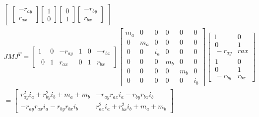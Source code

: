 \documentclass{article}
\begin{document}
\begin{gather}
\begin{bmatrix}
	\begin{bmatrix} -r_{ay} \\ r_{ax} \end{bmatrix}
	\begin{bmatrix} 1 \\ 0  \end{bmatrix}
	\begin{bmatrix} 0 \\ 1 \end{bmatrix}
	\begin{bmatrix} -r_{by} \\ r_{bx} \end{bmatrix}
\end{bmatrix} \\ 
JMJ^T = \begin{bmatrix}1&0&-r_{ay}&1&0&-r_{bx}\\ \:\:0&1&r_{ax}&0&1&r_{bx}\end{bmatrix}
\begin{bmatrix}m_a&0&0&0&0&0\\ \:0&m_a&0&0&0&0\\ \:0&0&i_a&0&0&0\\ \:0&0&0&m_b&0&0\\ \:0&0&0&0&m_b&0\\ \:0&0&0&0&0&i_b\end{bmatrix}
\begin{bmatrix}1&0\\ \:0&1\\ \:-r_{ay}&r{ax}\\ \:1&0\\ \:0&1\\ \:-r_{by}&r_{bx}\end{bmatrix} \\ =
\begin{bmatrix}
	r_{ay}^2i_a+r_{by}^2i_b+m_a+m_b&
	-r_{ay}r_{ax}i_a-r_{by}r_{bx}i_b\\
	-r_{ay}r_{ax}i_a-r_{by}r_{bx}i_b &
	r_{ax}^2i_a+r_{bx}^2i_b+m_a+m_b
\end{bmatrix} \\
\end{gather}
\end{document}
